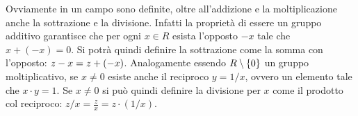 Ovviamente in un campo sono definite, oltre all'addizione e la moltiplicazione anche 
la sottrazione e la divisione. 
Infatti la proprietà di essere un gruppo additivo garantisce che 
per ogni $x\in R$ esista l'opposto $-x$ tale che $x+(-x)=0$.
Si potrà quindi definire la sottrazione come la somma con l'opposto: 
$z-x = z + (-x)$.
Analogamente essendo $R\setminus{\left\{ 0 \right\}}$ un gruppo moltiplicativo,
se $x\neq 0$ esiste anche il reciproco $y=1/x$, 
ovvero un elemento tale che $x\cdot y = 1$.
Se $x\neq 0$ si può quindi definire la divisione per $x$ come 
il prodotto col reciproco: $z/x = \frac{z}{x} = z\cdot (1/x)$.

%
%
%  
